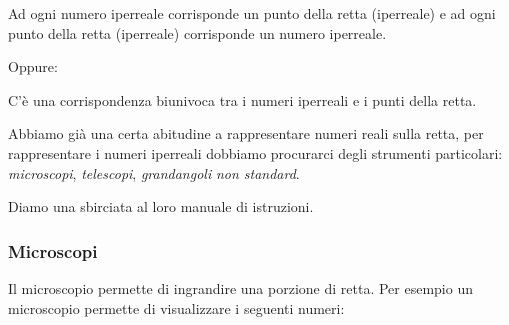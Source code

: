 \begin{postulato}
Ad ogni numero iperreale corrisponde un punto della retta (iperreale) e ad 
ogni punto della retta (iperreale) corrisponde un numero iperreale.
\end{postulato}

Oppure:

\begin{postulato}
C'è una corrispondenza biunivoca tra i numeri iperreali e 
i punti della retta.
\end{postulato}

Abbiamo già una certa abitudine a rappresentare numeri reali sulla retta, 
per rappresentare i numeri iperreali dobbiamo procurarci degli strumenti 
particolari: \emph{microscopi}, \emph{telescopi}, \emph{grandangoli} 
\emph{non standard}.

Diamo una sbirciata al loro manuale di istruzioni.

\newpage %

\subsubsection{Microscopi}
\label{subsec:insnum_microscopio}

Il microscopio permette di ingrandire una porzione di retta. 
Per esempio un microscopio permette di visualizzare i seguenti numeri:

